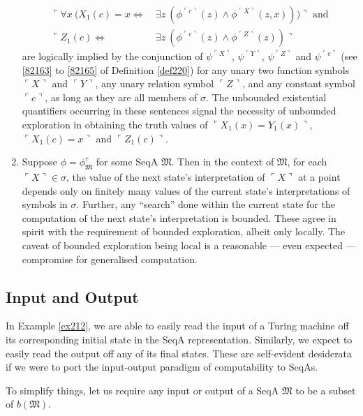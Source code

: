 \documentclass[12pt]{article}
\numberwithin{equation}{section}
\begin{document}
\begin{enumerate}[label=(C\arabic*)]
\begin{align*}
        \ulcorner \forall x \ (X_1(c) = x \iff & \ \exists z \ (\phi^{\ulcorner c \urcorner}(z) \wedge \phi^{\ulcorner X \urcorner}(z, x))) \urcorner \text{ and} \\
        \ulcorner Z_1(c) \iff & \ \exists z \ (\phi^{\ulcorner c \urcorner}(z) \wedge \phi^{\ulcorner Z \urcorner}(z)) \urcorner
    \end{align*}
    are logically implied by the conjunction of $\psi^{\ulcorner X \urcorner}$, $\psi^{\ulcorner Y \urcorner}$, $\psi^{\ulcorner Z \urcorner}$ and $\psi^{\ulcorner c \urcorner}$ (see \ref{82163} to \ref{82165} of Definition \ref{def220}) for any unary two function symbols $\ulcorner X \urcorner$ and $\ulcorner Y \urcorner$, any unary relation symbol $\ulcorner Z \urcorner$, and any constant symbol $\ulcorner c \urcorner$, as long as they are all members of $\sigma$. The unbounded existential quantifiers occurring in these sentences signal the necessity of unbounded exploration in obtaining the truth values of $\ulcorner X_1(x) = Y_1(x) \urcorner$, $\ulcorner X_1(c) = x \urcorner$ and $\ulcorner Z_1(c) \urcorner$. 
    \item Suppose $\phi = \phi^{\tau}_{\mathfrak{M}}$ for some SeqA $\mathfrak{M}$. Then in the context of $\mathfrak{M}$, for each $\ulcorner X \urcorner \in \sigma$, the value of the next state's interpretation of $\ulcorner X \urcorner$ at a point depends only on finitely many values of the current state's interpretations of symbols in $\sigma$. Further, any ``search'' done within the current state for the computation of the next state's interpretation is bounded. These agree in spirit with the requirement of bounded exploration, albeit only locally. The caveat of bounded exploration being local is a reasonable --- even expected --- compromise for generalised computation.
\end{enumerate}

\subsection{Input and Output}\label{ss250}

In Example \ref{ex212}, we are able to easily read the input of a Turing machine off its corresponding initial state in the SeqA representation. Similarly, we expect to easily read the output off any of its final states. These are self-evident desiderata if we were to port the input-output paradigm of computability to SeqAs. 

To simplify things, let us require any input or output of a SeqA $\mathfrak{M}$ to be a subset of $b(\mathfrak{M})$.
\end{document}
